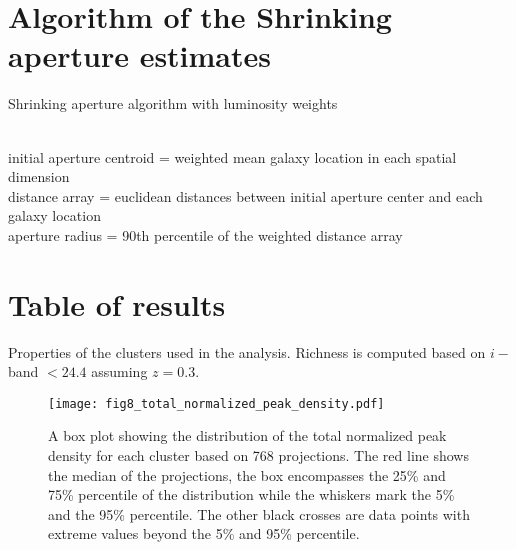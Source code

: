 \section{Algorithm of the Shrinking aperture estimates}
\label{app:shrink_apert}
\begin{algorithm}
	\caption{Shrinking aperture algorithm with luminosity weights}
	 \hrulefill \\

	 initial aperture centroid = weighted mean galaxy location in each spatial dimension\\
 	distance array = euclidean distances between initial aperture center and each galaxy
	location \\
 	aperture radius = 90th percentile of the weighted distance array\\ 
	   \hrulefill
\end{algorithm}

\section{Table of results}
\label{app:table_of_results}
\begin{landscape}
\begin{table}
	\begin{center}
	\caption{Properties of the clusters used in the analysis. Richness is
	computed based on $i-$band $< 24.4$ assuming $z=0.3$.\label{tab:cluster_prop}}
	
\end{center}
\end{table}
\end{landscape}

\begin{figure*}
	\begin{center}
	\texttt{[image: fig8\_total\_normalized\_peak\_density.pdf]}
	\caption{A box plot showing the distribution of the total normalized peak density 
		for each cluster 
		based on 768 projections. The red line shows the median of the projections,
		the box encompasses the 25\% and 75\% percentile of the distribution while
		the whiskers mark the 5\% and the 95\% percentile. The other black crosses
		are data points with extreme values beyond the 5\% and 95\% percentile.
		\label{fig:total_peak_dens_distribution}
	}
\end{center}
\end{figure*}

